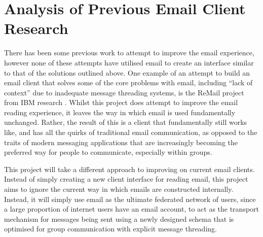 \section{Analysis of Previous Email Client Research}

There has been some previous work to attempt to improve the email experience, however none of these attempts have utilised email to create an interface similar to that of the solutions outlined above. One example of an attempt to build an email client that solves some of the core problems with email, including ``lack of context'' due to inadequate message threading systems, is the ReMail project from IBM research \cite{kerr2004designing}. Whilst this project does attempt to improve the email reading experience, it leaves the way in which email is used fundamentally unchanged. Rather, the result of this is a client that fundamentally still works like, and has all the quirks of traditional email communication, as opposed to the traits of modern messaging applications that are increasingly becoming the preferred way for people to communicate, especially within groups.

This project will take a different approach to improving on current email clients. Instead of simply creating a new client interface for reading email, this project aims to ignore the current way in which emails are constructed internally. Instead, it will simply use email as the ultimate federated network of users, since a large proportion of internet users have an email account, to act as the transport mechanism for messages being sent using a newly designed schema that is optimised for group communication with explicit message threading.
